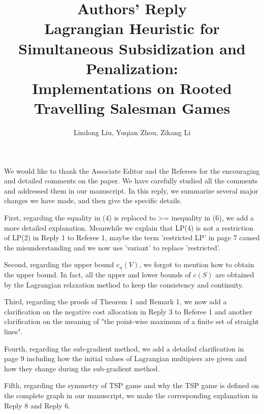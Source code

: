 \documentclass[11pt]{article}
\title{\textbf{Authors' Reply\\Lagrangian Heuristic for Simultaneous Subsidization and Penalization:\\
Implementations on Rooted Travelling Salesman Games}}
\author{Lindong Liu, Yuqian Zhou, Zikang Li}
\date{}
\begin{document}
\maketitle
\noindent

We would like to thank the Associate Editor and the Referees for the encouraging and detailed comments on the paper. We have carefully studied all the comments and addressed them in our manuscript.
In this reply, we summarize several major changes we have made, and then give the specific details.

First, regarding the equality in (4) is replaced to >= inequality in (6), we add a more detailed explanation. Meanwhile we explain that LP(4) is not a restriction of LP(2) in Reply 1 to Referee 1, maybe the term 'restricted LP' in page 7 caused the misunderstanding and we now use 'variant' to replace 'restricted'.

Second, regarding the upper bound $c_u(V)$, we forgot to mention how to obtain the upper bound.
In fact, all the upper and lower bounds of $c(S)$ are obtained by the Lagrangian relaxation method to keep the consistency and continuity.

Third, regarding the proofs of Theorem 1 and Remark 1, we now add a clarification on the negative cost allocation in Reply 3 to Referee 1 and another clarification on the meaning of "the point-wise maximum of a finite set of straight lines".


Fourth, regarding the sub-gradient method, we add a detailed clarification in page 9 including how the initial values of Lagrangian multipiers are given and how they change during the sub-gradient method.


Fifth, regarding the symmetry of TSP game and why the TSP game is defined on the complete graph in our manuscript, we make the corresponding explanation in Reply 8 and Reply 6.
\end{document}
